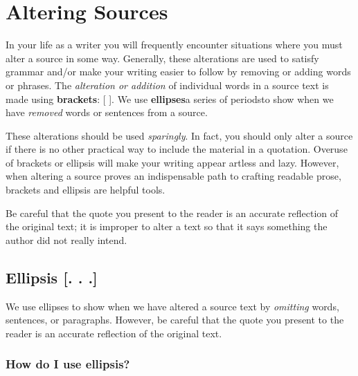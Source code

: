 
\chapter{Altering Sources}

In your life as a writer you will frequently encounter situations where you must
alter a source in some way. Generally, these alterations are used to satisfy
grammar and/or make your writing easier to follow by removing or adding words or
phrases. The \emph{alteration or addition} of individual words in a source text
is made using \textbf{brackets}: [ ]. We use \textbf{ellipses}\textemdash a
series of periods\textemdash to show when we have \emph{removed} words or
sentences from a source.

These alterations should be used \emph{sparingly}. In fact, you should only
alter a source if there is no other practical way to include the material in a
quotation. Overuse of brackets or ellipsis will make your writing appear artless
and lazy. However, when altering a source proves an indispensable path to
crafting readable prose, brackets and ellipsis are helpful tools.

Be careful that the quote you present to the reader is an accurate reflection of
the original text; it is improper to alter a text so that it says something the
author did not really intend.

\hypertarget{ellipsis}{}
\section{Ellipsis [. . .]} We use ellipses to show when we have altered a source
text by \emph{omitting} words, sentences, or paragraphs. However, be careful
that the quote you present to the reader is an accurate reflection of the
original text.

\subsection{How do I use ellipsis?}


